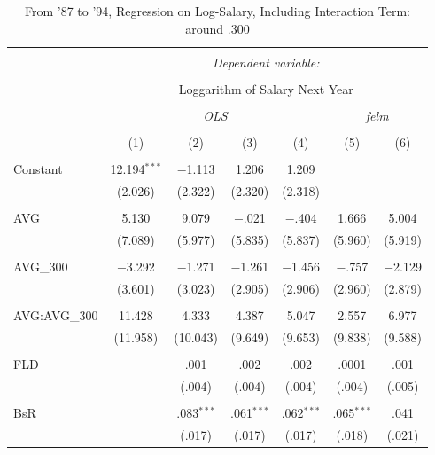 
\begin{table}[H] \centering
  \caption{From '87 to '94, Regression on Log-Salary, Including Interaction Term: around .300}
  \label{AVG300_B}
\tiny
\begin{tabular}{@{\extracolsep{5pt}}lcccccc}
\\[-1.8ex]\hline
\hline \\[-1.8ex]
 & \multicolumn{6}{c}{\textit{Dependent variable:}} \\
\cline{2-7}
\\[-1.8ex] & \multicolumn{6}{c}{Loggarithm of Salary Next Year} \\
\\[-1.8ex] & \multicolumn{4}{c}{\textit{OLS}} & \multicolumn{2}{c}{\textit{felm}} \\
\\[-1.8ex] & (1) & (2) & (3) & (4) & (5) & (6)\\
\hline \\[-1.8ex]
 Constant & 12.194$^{***}$ & $-$1.113 & 1.206 & 1.209 &  &  \\
  & (2.026) & (2.322) & (2.320) & (2.318) &  &  \\
  & & & & & & \\
 AVG & 5.130 & 9.079 & $-$.021 & $-$.404 & 1.666 & 5.004 \\
  & (7.089) & (5.977) & (5.835) & (5.837) & (5.960) & (5.919) \\
  & & & & & & \\
 AVG\_300 & $-$3.292 & $-$1.271 & $-$1.261 & $-$1.456 & $-$.757 & $-$2.129 \\
  & (3.601) & (3.023) & (2.905) & (2.906) & (2.960) & (2.879) \\
  & & & & & & \\
  AVG:AVG\_300 & 11.428 & 4.333 & 4.387 & 5.047 & 2.557 & 6.977 \\
  & (11.958) & (10.043) & (9.649) & (9.653) & (9.838) & (9.588) \\
  & & & & & & \\
 FLD &  & .001 & .002 & .002 & .0001 & .001 \\
  &  & (.004) & (.004) & (.004) & (.004) & (.005) \\
  & & & & & & \\
 BsR &  & .083$^{***}$ & .061$^{***}$ & .062$^{***}$ & .065$^{***}$ & .041 \\
  &  & (.017) & (.017) & (.017) & (.018) & (.021) \\

\end{tabular}
\end{table}
